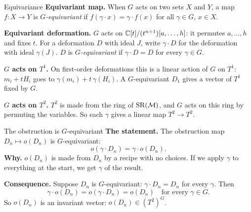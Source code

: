 \begin{frame}{Equivariance}
\textbf{Equivariant map.} When \(G\) acts on two sets \(X\) and \(Y\), a map \(f\colon X\to Y\) is \emph{\(G\)-equivariant} if \(f(\gamma\cdot x)=\gamma\cdot f(x)\) for all \(\gamma\in G\), \(x\in X\).
\par
\textbf{Equivariant deformation.} \(G\) acts on \(\mathbb C[t]/(t^{n+1})[a,\dots,h]\): it permutes \(a,\dots,h\) and fixes \(t\). For a deformation \(D\) with ideal \(J\), write \(\gamma\cdot D\) for the deformation with ideal \(\gamma(J)\). \(D\) is \emph{\(G\)-equivariant} if \(\gamma\cdot D=D\) for every \(\gamma\in G\).
\par
\textbf{\(G\) acts on \(T^1\).} On first-order deformations this is a linear action of \(G\) on \(T^1\): \(m_i+tH_i\) goes to \(\gamma(m_i)+t\,\gamma(H_i)\). A \(G\)-equivariant \(D_1\) gives a vector of \(T^1\) fixed by \(G\).
\par
\textbf{\(G\) acts on \(T^2\).} \(T^2\) is made from the ring of \(\operatorname{SR}(\mathcal M)\), and \(G\) acts on this ring by permuting the variables. So each \(\gamma\) gives a linear map \(T^2\to T^2\).
\end{frame}

\begin{frame}{The obstruction is \(G\)-equivariant}
\textbf{The statement.} The obstruction map \(D_n\mapsto o(D_n)\) is \(G\)-equivariant:
\[
\boxed{o(\gamma\cdot D_n)=\gamma\cdot o(D_n).}
\]
\textbf{Why.} \(o(D_n)\) is made from \(D_n\) by a recipe with no choices. If we apply \(\gamma\) to everything at the start, we get \(\gamma\) of the result.
\par
\textbf{Consequence.} Suppose \(D_n\) is \(G\)-equivariant: \(\gamma\cdot D_n=D_n\) for every \(\gamma\). Then
\[
\gamma\cdot o(D_n)=o(\gamma\cdot D_n)=o(D_n)\quad\text{for every }\gamma\in G.
\]
So \(o(D_n)\) is an invariant vector: \(o(D_n)\in(T^2)^G\).
\src{\textcolor{red}{Not re-checked for this slide.}}
\end{frame}

